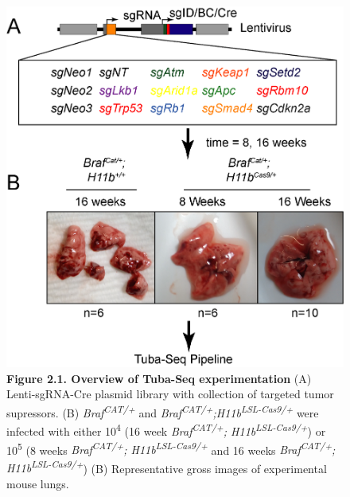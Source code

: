 \begin{figure}
\hypertarget{fig:04}{%
\centering
\includegraphics[width=1\textwidth,height=\textheight]{images/tuba1.png}
\caption{\textbf{Figure 2.1. Overview of Tuba-Seq experimentation} (A) Lenti-sgRNA-Cre plasmid library with collection of targeted tumor supressors. (B) \emph{Braf\textsuperscript{CAT/+}} and \emph{Braf\textsuperscript{CAT/+};H11b\textsuperscript{LSL-Cas9/+}} were infected with either 10\textsuperscript{4} (16 week \emph{Braf\textsuperscript{CAT/+}; H11b\textsuperscript{LSL-Cas9/+}}) or 10\textsuperscript{5} (8 weeks \emph{Braf\textsuperscript{CAT/+}; H11b\textsuperscript{LSL-Cas9/+}} and 16 weeks \emph{Braf\textsuperscript{CAT/+}; H11b\textsuperscript{LSL-Cas9/+}}) (B) Representative gross images of experimental mouse lungs.}\label{fig:04}
}
\end{figure}

